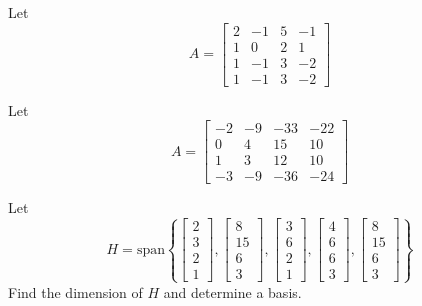 \documentclass{ximera}
\begin{document}
\begin{problem}\label{prb:5.1} Let
    $$A =
\begin{bmatrix}
2 & -1 & 5 & -1\\
1 & 0 &2 & 1 \\
1 & -1 & 3 & -2\\
1 & -1 & 3 & -2
\end{bmatrix}$$
\end{problem}
 
\begin{problem}\label{prb:5.3} Let $$A=
\begin{bmatrix}
-2 & -9 & -33 & -22\\
0 & 4 & 15 & 10\\
1 & 3 & 12 & 10\\
-3 & -9 &-36 & -24
\end{bmatrix}$$
\end{problem}
 
\begin{problem}\label{prb:5.5} Let $$H=\mbox{span}\left\{ \left[
    \begin{array}{r}
    2 \\
    3 \\
    2 \\
    1
    \end{array}
    \right] ,\left[
    \begin{array}{r}
    8 \\
    15 \\
    6 \\
    3
    \end{array}
    \right] ,\left[
    \begin{array}{r}
    3 \\
    6 \\
    2 \\
    1
    \end{array}
    \right] ,\left[
    \begin{array}{r}
    4 \\
    6 \\
    6 \\
    3
    \end{array}
    \right] ,\left[
    \begin{array}{r}
    8 \\
    15 \\
    6 \\
    3
    \end{array}
    \right] \right\} $$
    Find the dimension of $H$ and determine a basis.
     
    \end{problem}
 
\end{document}
